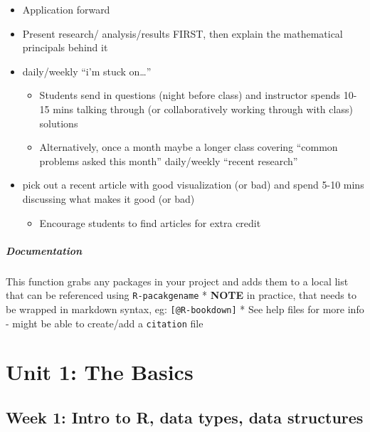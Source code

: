 \documentclass[
]{book}
\providecommand{\tightlist}{%
  \setlength{\itemsep}{0pt}\setlength{\parskip}{0pt}}
\begin{document}
\begin{itemize}
\tightlist
\item
  Application forward
\item
  Present research/ analysis/results FIRST, then explain the mathematical principals behind it
\item
  daily/weekly ``i'm stuck on\ldots{}''

  \begin{itemize}
  \tightlist
  \item
    Students send in questions (night before class) and instructor spends 10-15 mins talking through (or collaboratively working through with class) solutions
  \item
    Alternatively, once a month maybe a longer class covering ``common problems asked this month''
    daily/weekly ``recent research''
  \end{itemize}
\item
  pick out a recent article with good visualization (or bad) and spend 5-10 mins discussing what makes it good (or bad)

  \begin{itemize}
  \tightlist
  \item
    Encourage students to find articles for extra credit
  \end{itemize}
\end{itemize}

\hypertarget{documentation}{%
\paragraph*{Documentation}\label{documentation}}

This function grabs any packages in your project and adds them to a local list that can be referenced using \texttt{R-pacakgename}
* \textbf{NOTE} in practice, that needs to be wrapped in markdown syntax, eg:
\texttt{{[}@R-bookdown{]}}
* See help files for more info - might be able to create/add a \texttt{citation} file

\hypertarget{unit1}{%
\chapter{Unit 1: The Basics}\label{unit1}}

\hypertarget{week-1-intro-to-r-data-types-data-structures-1}{%
\section{Week 1: Intro to R, data types, data structures}\label{week-1-intro-to-r-data-types-data-structures-1}}
\end{document}
